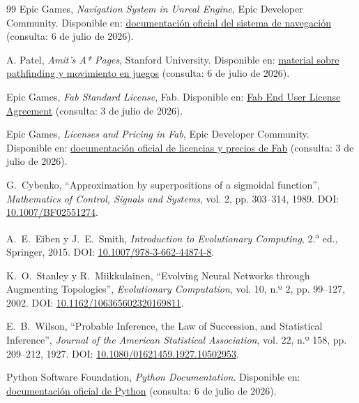 \begin{sloppypar}
\begin{thebibliography}{99}
Epic Games, \textit{Navigation System in Unreal Engine}, Epic Developer Community. Disponible en: \href{https://dev.epicgames.com/documentation/unreal-engine/navigation-system-in-unreal-engine}{documentación oficial del sistema de navegación} (consulta: 6 de julio de 2026).

A. Patel, \textit{Amit's A* Pages}, Stanford University. Disponible en: \href{https://theory.stanford.edu/~amitp/GameProgramming/}{material sobre pathfinding y movimiento en juegos} (consulta: 6 de julio de 2026).

Epic Games, \textit{Fab Standard License}, Fab. Disponible en: \href{https://www.fab.com/eula?lang=en}{Fab End User License Agreement} (consulta: 3 de julio de 2026).

Epic Games, \textit{Licenses and Pricing in Fab}, Epic Developer Community. Disponible en: \href{https://dev.epicgames.com/documentation/fab/licenses-and-pricing-in-fab?lang=en-US}{documentación oficial de licencias y precios de Fab} (consulta: 3 de julio de 2026).

G.~Cybenko, ``Approximation by superpositions of a sigmoidal function'', \textit{Mathematics of Control, Signals and Systems}, vol. 2, pp. 303--314, 1989. DOI\@: \href{https://doi.org/10.1007/BF02551274}{10.1007/BF02551274}.

A.~E.~Eiben y J.~E.~Smith, \textit{Introduction to Evolutionary Computing}, 2.\textsuperscript{a} ed., Springer, 2015. DOI\@: \href{https://doi.org/10.1007/978-3-662-44874-8}{10.1007/978-3-662-44874-8}.

K.~O.~Stanley y R.~Miikkulainen, ``Evolving Neural Networks through Augmenting Topologies'', \textit{Evolutionary Computation}, vol. 10, n.º 2, pp. 99--127, 2002. DOI\@: \href{https://doi.org/10.1162/106365602320169811}{10.1162/106365602320169811}.

E.~B.~Wilson, ``Probable Inference, the Law of Succession, and Statistical Inference'', \textit{Journal of the American Statistical Association}, vol. 22, n.º 158, pp. 209--212, 1927. DOI\@: \href{https://doi.org/10.1080/01621459.1927.10502953}{10.1080/01621459.1927.10502953}.

Python Software Foundation, \textit{Python Documentation}. Disponible en: \href{https://docs.python.org/}{documentación oficial de Python} (consulta: 6 de julio de 2026).


\end{thebibliography}
\end{sloppypar}
